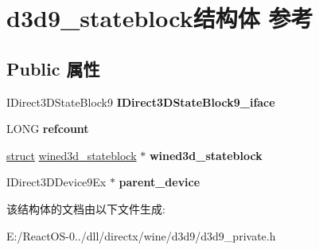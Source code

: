 \hypertarget{structd3d9__stateblock}{}\section{d3d9\+\_\+stateblock结构体 参考}
\label{structd3d9__stateblock}
\subsection*{Public 属性}
\begin{DoxyCompactItemize}
\item 
\mbox{\label{structd3d9__stateblock_ab8897b9670a50a3c4b076f68b1e3b2a6}} 
I\+Direct3\+D\+State\+Block9 {\bfseries I\+Direct3\+D\+State\+Block9\+\_\+iface}
\item 
\mbox{\label{structd3d9__stateblock_a5e42b4f51b4cf8f6dffe510f7002fd53}} 
L\+O\+NG {\bfseries refcount}
\item 
\mbox{\label{structd3d9__stateblock_a005ae8cc4baf8d5eafbad73de38ffd48}} 
\hyperlink{interfacestruct}{struct} \hyperlink{structwined3d__stateblock}{wined3d\+\_\+stateblock} $\ast$ {\bfseries wined3d\+\_\+stateblock}
\item 
\mbox{\label{structd3d9__stateblock_a5f400401899f076731d9a95a32d4bb8e}} 
I\+Direct3\+D\+Device9\+Ex $\ast$ {\bfseries parent\+\_\+device}
\end{DoxyCompactItemize}


该结构体的文档由以下文件生成\+:\begin{DoxyCompactItemize}
\item 
E\+:/\+React\+O\+S-\/0../dll/directx/wine/d3d9/d3d9\+\_\+private.\+h\end{DoxyCompactItemize}
